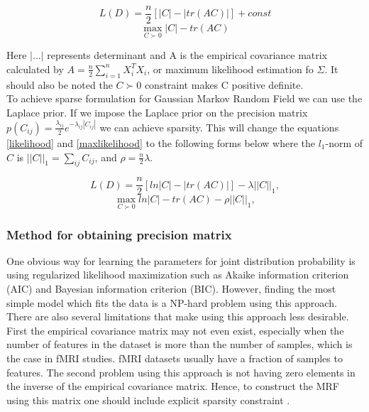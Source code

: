 \documentclass{article} %
\begin{document}
\begin{multicols}{2}
\begin{equation}\label{likelihood}
L(D) = \frac{n}{2} [|C| -  |tr(AC)|] + const
\end{equation}\break
\begin{equation}\label{maxlikelihood}
\max_{C\succ0} |C| - tr(AC)
\end{equation}
\end{multicols}

Here $|...|$ represents determinant and A is the empirical covariance 
matrix calculated by $A = \frac{n}{2} \sum_{i=1}^{n} X_i^T X_i$, or 
maximum likelihood estimation fo $\Sigma$. It should also be noted 
the $C\succ0$ constraint makes C positive definite.\\

To achieve sparse formulation for Gaussian Markov Random Field we can use 
the Laplace prior. If we impose the Laplace prior on the precision matrix 
$p(C_{ij}) = \frac{\lambda_{ij}}{2} e^{-\lambda_{ij}|C_{ij}|} $ we can 
achieve sparsity. This will change the equations \eqref{likelihood} and 
\eqref{maxlikelihood} to the following forms below where the $l_{1}$-norm 
of $C$ is $||C||_{1}= \sum_{ij}C_{ij}$, and $\rho=\frac{n}{2}\lambda$.

\begin{multicols}{2}
\begin{equation}\label{loglikelihood}
L(D) = \frac{n}{2} [ln|C| -  |tr(AC)|] - \lambda||C||_{1}, 
\end{equation}\break
\begin{equation}\label{logmaxlikelihood}
\max_{C\succ0} ln|C| - tr(AC) - \rho||C||_{1},
\end{equation}
\end{multicols}


\subsubsection{Method for obtaining precision matrix}  
One obvious way for learning the parameters for joint distribution probability 
is using regularized likelihood maximization such as Akaike information criterion 
(AIC) and Bayesian information criterion (BIC). However, 
finding the most simple model which fits the data is a NP-hard problem using this 
approach. There are also several limitations that make using this approach less 
desirable. First the empirical covariance matrix may not even exist, especially when 
the number of features in the dataset is more than the number of samples, which 
is the case in fMRI studies. fMRI datasets usually have a fraction of samples to 
features. The second problem using this approach is not having zero elements in the 
inverse of the empirical covariance matrix. Hence, to construct the MRF using this 
matrix one should include explicit sparsity constraint \cite{Rish2014Book}. \\
\end{document}
